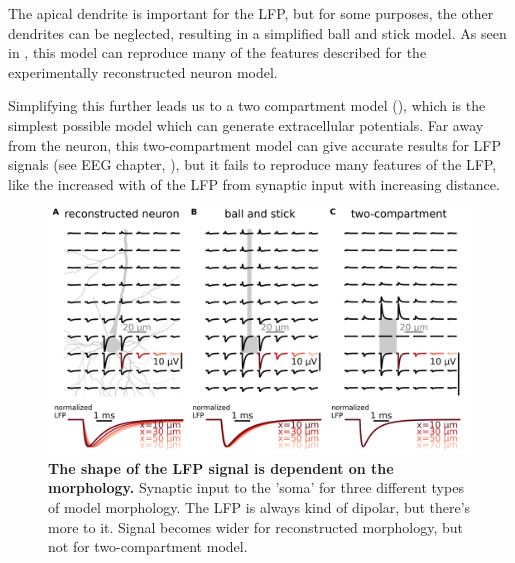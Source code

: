 The apical dendrite is important for the LFP, but for some purposes, the other dendrites can be neglected, resulting in a simplified ball and stick model. As seen in , this model can reproduce many of the features described for the experimentally reconstructed neuron model.

Simplifying this further leads us to a two compartment model  (),
which is the simplest possible model which can generate extracellular potentials.  
Far away from the neuron, this two-compartment model can give accurate results for LFP signals (see EEG chapter, ), but it fails to reproduce many features of the LFP,
like the increased with of the LFP from synaptic input with increasing distance.


\begin{figure}[!ht]
\begin{center}
\includegraphics[width=1.\textwidth]{Figures/LFP/compare_hay_bns_2comp.png}
\end{center}
\caption{\textbf{The shape of the LFP signal is dependent on the morphology.}
Synaptic input to the 'soma' for three different types of model morphology. The LFP is always kind of dipolar, but there's more to it. Signal becomes wider for reconstructed morphology, but not for two-compartment model.
}
\label{fig:LFP:morph_matters}
\end{figure}





\section{}
\label{sec:LFP:freq_content}

